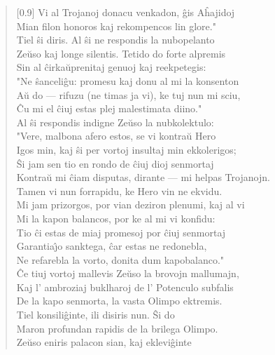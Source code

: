 \begin{verse}[0.9\textwidth]
          Vi al Trojanoj donacu venkadon, \^gis A\^hajidoj\\
          Mian filon honoros kaj rekompencos lin glore."\\
          Tiel \^si diris. Al \^si ne respondis la nubopelanto\\
          Ze\u uso kaj longe silentis. Tetido do forte alpremis\\
          Sin al \^cirka\u uprenitaj genuoj kaj reekpetegis:\\
          "Ne \^sanceli\^gu: promesu kaj donu al mi la konsenton\\
          A\u u do --- rifuzu (ne timas ja vi), ke tuj nun mi sciu,\\
          \^Cu mi el \^ciuj estas plej malestimata diino."\\
          \vin   Al \^si respondis indigne Ze\u uso la nubkolektulo:\\
          "Vere, malbona afero estos, se vi kontra\u u Hero\\
          Igos min, kaj \^si per vortoj insultaj min ekkolerigos;\\
          \^Si jam sen tio en rondo de \^ciuj dioj senmortaj\\
          Kontra\u u mi \^ciam disputas, dirante --- mi helpas Trojanojn.\\
          Tamen vi nun forrapidu, ke Hero vin ne ekvidu.\\
          Mi jam prizorgos, por vian deziron plenumi, kaj al vi\\
          Mi la kapon balancos, por ke al mi vi konfidu:\\
          Tio \^ci estas de miaj promesoj por \^ciuj senmortaj\\
          Garantia\^{\j}o sanktega, \^car estas ne redonebla,\\
          Ne refarebla la vorto, donita dum kapobalanco."\\
          \^Ce tiuj vortoj mallevis Ze\u uso la brovojn mallumajn,\\
          Kaj l' ambroziaj buklharoj de l' Potenculo subfalis\\
          De la kapo senmorta, la vasta Olimpo ektremis.\\
          \vin   Tiel konsili\^ginte, ili disiris nun. \^Si do\\
          Maron profundan rapidis de la brilega Olimpo.\\
          Ze\u uso eniris palacon sian, kaj eklevi\^ginte\\

\end{verse}
